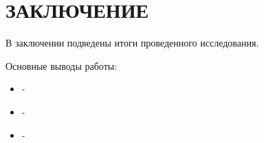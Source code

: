 \chapter*{ЗАКЛЮЧЕНИЕ}

В заключении подведены итоги проведенного исследования. 

Основные выводы работы:
\begin{itemize}
  \item -
  \item -
  \item -
\end{itemize}


